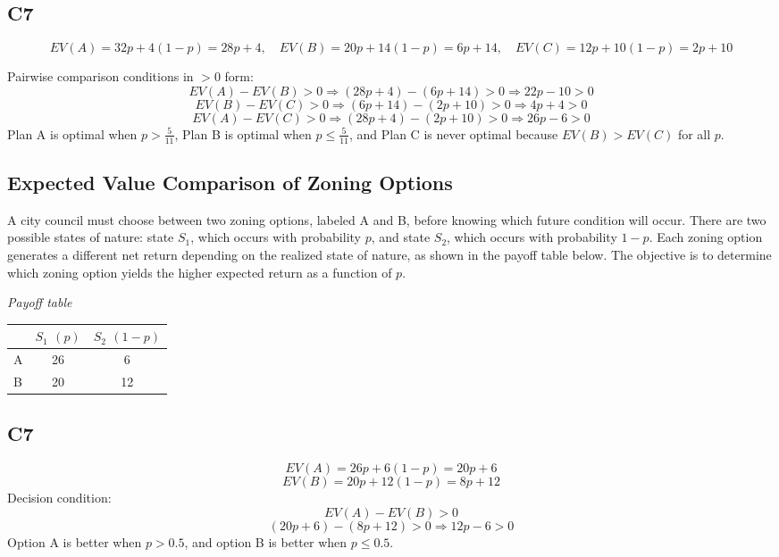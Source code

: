 \begin{ExamProblems}
		\subsection*{C7}
		\[
		EV(A)=32p+4(1-p)=28p+4,\quad
		EV(B)=20p+14(1-p)=6p+14,\quad
		EV(C)=12p+10(1-p)=2p+10
		\]
		
		Pairwise comparison conditions in $>0$ form:
		\[
		EV(A)-EV(B)>0 \Rightarrow (28p+4)-(6p+14)>0 \Rightarrow 22p-10>0
		\]
		\[
		EV(B)-EV(C)>0 \Rightarrow (6p+14)-(2p+10)>0 \Rightarrow 4p+4>0
		\]
		\[
		EV(A)-EV(C)>0 \Rightarrow (28p+4)-(2p+10)>0 \Rightarrow 26p-6>0
		\]
		Plan A is optimal when $p>\frac{5}{11}$, Plan B is optimal when $p \le \frac{5}{11}$, and Plan C is never optimal because $EV(B) > EV(C)$ for all $p$.
		
		\item
		\subsection*{Expected Value Comparison of Zoning Options}
		A city council must choose between two zoning options, labeled A and B, before knowing which future condition will occur.
		There are two possible states of nature: state $S_1$, which occurs with probability $p$, and state $S_2$, which occurs with probability $1-p$.
		Each zoning option generates a different net return depending on the realized state of nature, as shown in the payoff table below.
		The objective is to determine which zoning option yields the higher expected return as a function of $p$.
		
		\begin{center}
			\textit{Payoff table} \\
			\begin{tabular}{l c c}
				\toprule
				& $S_1$ $(p)$ & $S_2$ $(1-p)$ \\
				\midrule
				A & 26 & 6 \\
				B & 20 & 12 \\
				\bottomrule
			\end{tabular}
		\end{center}
		
		\subsection*{C7}
		\[
		EV(A)=26p+6(1-p)=20p+6
		\]
		\[
		EV(B)=20p+12(1-p)=8p+12
		\]
		Decision condition:
		\[
		EV(A)-EV(B)>0
		\]
		\[
		(20p+6)-(8p+12)>0 \Rightarrow 12p-6>0
		\]
		Option A is better when $p>0.5$, and option B is better when $p \le 0.5$.
	\end{ExamProblems}

